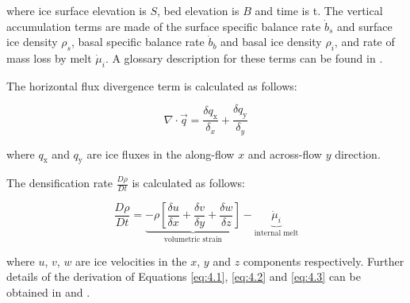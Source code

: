 where ice surface elevation is $S$, bed elevation is $B$ and time is \gls{t}.
The vertical accumulation terms are made of the surface specific balance rate $\dot{b}_s$ and surface ice density $\rho_s$, basal specific balance rate $\dot{b}_b$ and basal ice density $\rho_i$, and rate of mass loss by melt $\dot{\mu}_i$.
A glossary description for these terms can be found in \citet{CogleyGlossaryglaciermass2011}.

The horizontal flux divergence term is calculated as follows:

\begin{equation}
  \nabla\cdot \overset{\rightarrow}{q} = \frac{\delta q_\text{x}}{\delta_x} + \frac{\delta q_\text{y}}{\delta_y} \label{eq:4.2}
\end{equation}

where $q_\text{x}$ and $q_\text{y}$ are ice fluxes in the along-flow $x$ and across-flow $y$ direction.

The densification rate $\frac{D\rho}{Dt}$ is calculated as follows:

\begin{equation}
  \frac{D\rho}{Dt} = \underbrace{-\rho \left[ \frac{\delta u}{\delta x} + \frac{\delta v}{\delta y} + \frac{\delta w}{\delta z} \right]}_{\text{volumetric strain}} - \underbrace{\dot{\mu}_i}_{\text{internal melt}} \label{eq:4.3}
\end{equation}

where $u$, $v$, $w$ are ice velocities in the $x$, $y$ and $z$ components respectively.
Further details of the derivation of Equations \eqref{eq:4.1}, \eqref{eq:4.2} and \eqref{eq:4.3} can be obtained in \citet{WhillansEquationContinuityits1977} and \citet{ReehCombiningSARinterferometry1999}.





